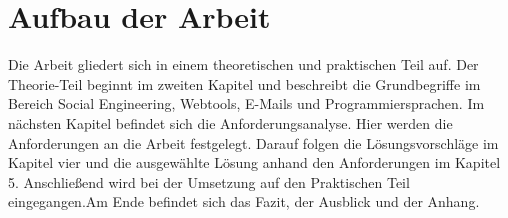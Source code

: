 \section{Aufbau der Arbeit}
\label {sec:Aufbau der Arbeit} 
Die Arbeit gliedert sich in einem theoretischen und praktischen Teil auf. Der Theorie-Teil beginnt im zweiten Kapitel und beschreibt die Grundbegriffe im Bereich Social Engineering, Webtools, E-Mails und Programmiersprachen. Im nächsten Kapitel befindet sich die Anforderungsanalyse. Hier werden die Anforderungen an die Arbeit festgelegt. Darauf folgen die Lösungsvorschläge im Kapitel vier und die ausgewählte Lösung anhand den Anforderungen im Kapitel 5. Anschließend wird bei der Umsetzung auf den Praktischen Teil eingegangen.Am Ende befindet sich das Fazit, der Ausblick und der Anhang.






